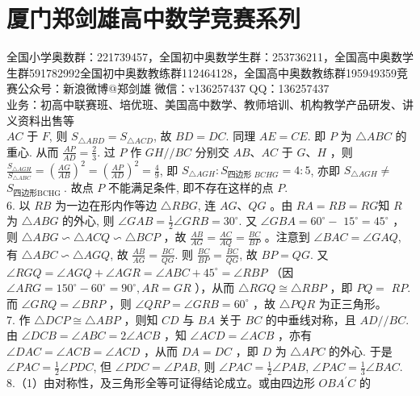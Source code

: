 \documentclass[10pt]{article}
\begin{document}
\section*{厦门郑剑雄高中数学竞赛系列}
全国小学奥数群：221739457，全国初中奥数学生群：253736211，全国高中奥数学生群591782992全国初中奥数教练群112464128，全国高中奥数教练群195949359竞赛公众号：新浪微博@郑剑雄 微信：v136257437 QQ：136257437\\
业务：初高中联赛班、培优班、美国高中数学、教师培训、机构教学产品研发、讲义资料出售等\\
$A C$ 于 $F$, 则 $S_{\triangle A B D}=S_{\triangle A C D}$, 故 $B D=D C$. 同理 $A E=C E$. 即 $P$ 为 $\triangle A B C$ 的重心. 从而 $\frac{A P}{A D}=\frac{2}{3}$. 过 $P$ 作 $G H / / B C$ 分别交 $A B 、 A C$ 于 $G 、 H$ ，则 $\frac{S_{\triangle A G H}}{S_{\triangle A B C}}=\left(\frac{A G}{A B}\right)^{2}=\left(\frac{A P}{A D}\right)^{2}=\frac{4}{9}$, 即 $S_{\triangle A G H}: S_{\text {四边形 } B C H G}=4: 5$, 亦即 $S_{\triangle A G H} \neq$ $S_{\text {四边形BCHG }}$. 故点 $P$ 不能满足条件, 即不存在这样的点 $P$.\\
6. 以 $R B$ 为一边在形内作等边 $\triangle R B G$, 连 $A G 、 Q G$ 。由 $R A=R B=R G$知 $R$ 为 $\triangle A B G$ 的外心, 则 $\angle G A B=\frac{1}{2} \angle G R B=30^{\circ}$. 又 $\angle G B A=60^{\circ}-$ $15^{\circ}=45^{\circ}$ ，则 $\triangle A B G \backsim \triangle A C Q \backsim \triangle B C P$ ，故 $\frac{A B}{A G}=\frac{A C}{A Q}=\frac{B C}{B P}$ 。注意到 $\angle B A C=\angle G A Q$, 有 $\triangle A B C \backsim \triangle A G Q$, 故 $\frac{A B}{A G}=\frac{B C}{Q G}$. 则 $\frac{B C}{B P}=\frac{B C}{Q G}$, 故 $B P=Q G$. 又 $\angle R G Q=\angle A G Q+\angle A G R=\angle A B C+45^{\circ}=\angle R B P$ （因 $\angle A R G=150^{\circ}-60^{\circ}=90^{\circ}, A R=G R$ ），从而 $\triangle R G Q \cong \triangle R B P$ ，即 $P Q=$ $R P$. 而 $\angle G R Q=\angle B R P$ ，则 $\angle Q R P=\angle G R B=60^{\circ}$ ，故 $\triangle P Q R$ 为正三角形。\\
7. 作 $\triangle D C P \cong \triangle A B P$ ，则知 $C D$ 与 $B A$ 关于 $B C$ 的中垂线对称，且 $A D / / B C$. 由 $\angle D C B=\angle A B C=2 \angle A C B$ ，知 $\angle A C D=\angle A C B$ ，亦有 $\angle D A C=\angle A C B=\angle A C D$ ，从而 $D A=D C$ ，即 $D$ 为 $\triangle A P C$ 的外心. 于是 $\angle P A C=\frac{1}{2} \angle P D C$, 但 $\angle P D C=\angle P A B$, 则 $\angle P A C=\frac{1}{2} \angle P A B$, $\angle P A C=\frac{1}{3} \angle B A C$.\\
8.（1）由对称性，及三角形全等可证得结论成立。或由四边形 $O B A^{\prime} C$ 的\\
\end{document}
